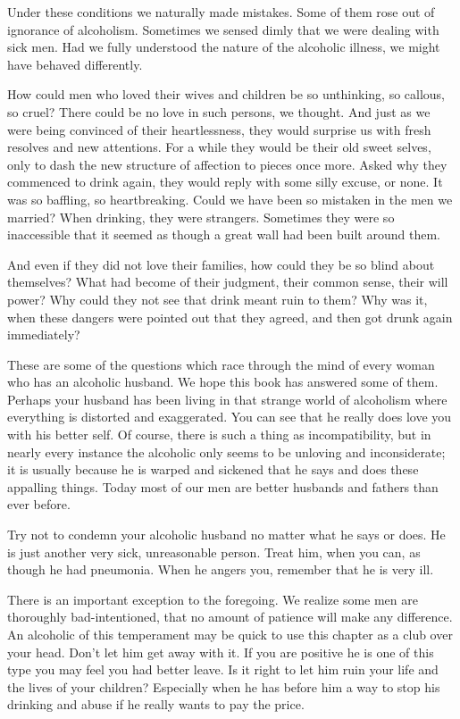 \begin{biblechapter}
Under these conditions we naturally made mistakes.  Some of them rose out of ignorance of alcoholism.  Sometimes we sensed dimly that we were dealing with sick men.  Had we fully understood the nature of the alcoholic illness, we might have behaved differently.

How could men who loved their wives and children be so unthinking, so callous, so cruel?  There could be no love in such persons, we thought.  And just as we were being convinced of their heartlessness, they would surprise us with fresh resolves and new attentions.  For a while they would be their old sweet selves, only to dash the new structure of affection to pieces once more.  Asked why they commenced to drink again, they would reply with some silly excuse, or none.  It was so baffling, so heartbreaking.  Could we have been so mistaken in the men we married?  When drinking, they were strangers.  Sometimes they were so inaccessible that it seemed as though a great wall had been built around them.

And even if they did not love their families, how could they be so blind about themselves?  What had become of their judgment, their common sense, their will power?  Why could they not see that drink meant ruin to them?  Why was it, when these dangers were pointed out that they agreed, and then got drunk again immediately?

These are some of the questions which race through the mind of every woman who has an alcoholic husband.  We hope this book has answered some of them.  Perhaps your husband has been living in that strange world of alcoholism where everything is distorted and exaggerated.  You can see that he really does love you with his better self.  Of course, there is such a thing as incompatibility, but in nearly every instance the alcoholic only seems to be unloving and inconsiderate; it is usually because he is warped and sickened that he says and does these appalling things.  Today most of our men are better husbands and fathers than ever before.

Try not to condemn your alcoholic husband no matter what he says or does.  He is just another very sick, unreasonable person.  Treat him, when you can, as though he had pneumonia.  When he angers you, remember that he is very ill.

There is an important exception to the foregoing.  We realize some men are thoroughly bad-intentioned, that no amount of patience will make any difference.  An alcoholic of this temperament may be quick to use this chapter as a club over your head.  Don't let him get away with it.  If you are positive he is one of this type you may feel you had better leave.  Is it right to let him ruin your life and the lives of your children?  Especially when he has before him a way to stop his drinking and abuse if he really wants to pay the price.


\end{biblechapter}
